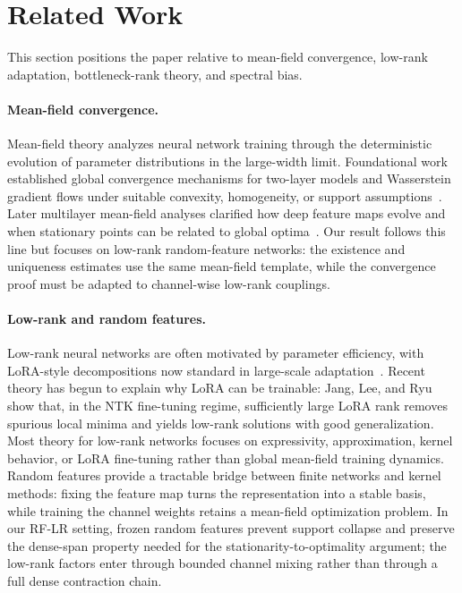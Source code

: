 \documentclass{article}
\begin{document}
\section{Related Work}
\label{sec:related}

This section positions the paper relative to mean-field convergence, low-rank adaptation, bottleneck-rank theory, and spectral bias.

\paragraph{Mean-field convergence.}
Mean-field theory analyzes neural network training through the deterministic evolution of parameter distributions in the large-width limit. Foundational work established global convergence mechanisms for two-layer models and Wasserstein gradient flows under suitable convexity, homogeneity, or support assumptions~\cite{mei2018,chizat2018}. Later multilayer mean-field analyses clarified how deep feature maps evolve and when stationary points can be related to global optima~\cite{pham2021,nguyen2023}. Our result follows this line but focuses on low-rank random-feature networks: the existence and uniqueness estimates use the same mean-field template, while the convergence proof must be adapted to channel-wise low-rank couplings.

\paragraph{Low-rank and random features.}
Low-rank neural networks are often motivated by parameter efficiency, with LoRA-style decompositions now standard in large-scale adaptation~\cite{hu2021}. Recent theory has begun to explain why LoRA can be trainable: Jang, Lee, and Ryu~\cite{jang2024lora} show that, in the NTK fine-tuning regime, sufficiently large LoRA rank removes spurious local minima and yields low-rank solutions with good generalization. Most theory for low-rank networks focuses on expressivity, approximation, kernel behavior, or LoRA fine-tuning rather than global mean-field training dynamics. Random features provide a tractable bridge between finite networks and kernel methods: fixing the feature map turns the representation into a stable basis, while training the channel weights retains a mean-field optimization problem. In our RF-LR setting, frozen random features prevent support collapse and preserve the dense-span property needed for the stationarity-to-optimality argument; the low-rank factors enter through bounded channel mixing rather than through a full dense contraction chain.
\end{document}

